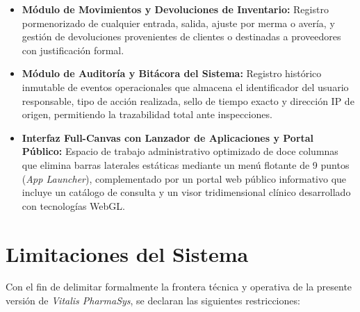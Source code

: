 \begin{itemize}
    \item \textbf{Módulo de Movimientos y Devoluciones de Inventario:} Registro pormenorizado de cualquier entrada, salida, ajuste por merma o avería, y gestión de devoluciones provenientes de clientes o destinadas a proveedores con justificación formal.
    \item \textbf{Módulo de Auditoría y Bitácora del Sistema:} Registro histórico inmutable de eventos operacionales que almacena el identificador del usuario responsable, tipo de acción realizada, sello de tiempo exacto y dirección IP de origen, permitiendo la trazabilidad total ante inspecciones.
    \item \textbf{Interfaz Full-Canvas con Lanzador de Aplicaciones y Portal Público:} Espacio de trabajo administrativo optimizado de doce columnas que elimina barras laterales estáticas mediante un menú flotante de 9 puntos (\textit{App Launcher}), complementado por un portal web público informativo que incluye un catálogo de consulta y un visor tridimensional clínico desarrollado con tecnologías WebGL.
\end{itemize}

\section{Limitaciones del Sistema}

Con el fin de delimitar formalmente la frontera técnica y operativa de la presente versión de \textit{Vitalis PharmaSys}, se declaran las siguientes restricciones:

